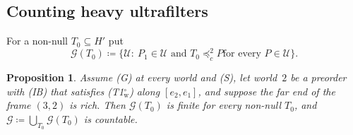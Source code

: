 \documentclass[11pt]{article}
\newtheorem{proposition}[theorem]{Proposition}
\theoremstyle{definition}\newtheorem{definition}[theorem]{Definition}
\theoremstyle{remark}\newtheorem{remark}[theorem]{Remark}
\newcommand{\Uf}{\mathcal U}
\newcommand{\Tw}{\textup{(T1$^\circ_{\mathrm w}$)}}
\begin{document}
\subsection{Counting heavy ultrafilters}\label{sec:count2}

For a non-null $T_0\subseteq H'$ put
\[
 \mathcal G(T_0)\coloneqq\{\Uf:\ P_1\in\Uf\text{ and }T_0\preceq^2_cP\text{
 for every }P\in\Uf\}.
\]

\begin{proposition}\label{prop:count2}
Assume (G) at every world and (S), let world~$2$ be a preorder with (IB)
that satisfies \Tw{} along $[e_2,e_1]$, and suppose the far end of the frame
$(3,2)$ is rich. Then $\mathcal G(T_0)$ is finite for every non-null $T_0$,
and $\mathcal G\coloneqq\bigcup_{T_0}\mathcal G(T_0)$ is countable.
\end{proposition}
\end{document}
